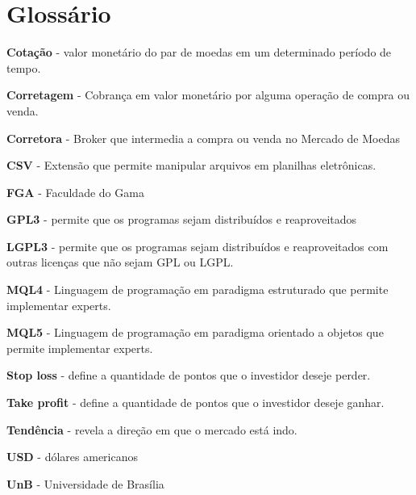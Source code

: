 \chapter{Glossário}

\textbf{Cotação} - valor monetário do par de moedas em um determinado período de tempo.

\textbf{Corretagem} - Cobrança em valor monetário por alguma operação de compra ou venda.

\textbf{Corretora} - Broker que intermedia a compra ou venda no Mercado de Moedas

\textbf{CSV} - Extensão que permite manipular arquivos em planilhas eletrônicas.

\textbf{FGA} - Faculdade do Gama

\textbf{GPL3} - permite que os programas sejam distribuídos e reaproveitados

\textbf{LGPL3} -  permite que os programas sejam distribuídos e reaproveitados com outras licenças que não sejam GPL ou LGPL.

\textbf{MQL4} - Linguagem de programação em paradigma estruturado que permite implementar experts.

\textbf{MQL5 }- Linguagem de programação em paradigma orientado a objetos que permite implementar experts.

\textbf{Stop loss} - define a quantidade de pontos que o investidor deseje perder.

\textbf{Take profit} - define a quantidade de pontos que o investidor deseje ganhar.

\textbf{Tendência} - revela a direção em que o mercado está indo.

\textbf{USD} - dólares americanos

\textbf{UnB} - Universidade de Brasília
